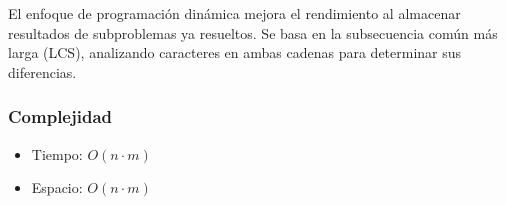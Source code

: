 El enfoque de programación dinámica mejora el rendimiento al almacenar resultados de subproblemas ya resueltos. Se basa en la subsecuencia común más larga (LCS), analizando caracteres en ambas cadenas para determinar sus diferencias.

\subsubsection{Complejidad}

\begin{itemize}
    \item Tiempo: $O(n \cdot m)$
    \item Espacio: $O(n \cdot m)$
\end{itemize}
